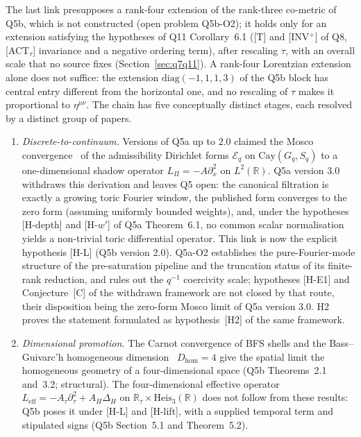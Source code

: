 \documentclass[11pt,a4paper]{article}
\theoremstyle{definition}
\newcommand{\Heis}{\mathrm{Heis}}
\newcommand{\Leff}{L_{\mathrm{eff}}}
\newcommand{\Lpi}{L_\Pi}
\newcommand{\Atau}{A_\tau}
\newcommand{\AH}{A_H}
\newcommand{\Dhom}{D_{\mathrm{hom}}}
\begin{document}
    The last link presupposes a rank-four extension of the rank-three co-metric of Q5b, which is
    not constructed (open problem Q5b-O2); it holds only for an extension satisfying the
    hypotheses of Q11 Corollary~6.1 ([T] and [INV$^+$] of Q8, [ACT$_\tau$] invariance and a negative ordering term), after rescaling
    $\tau$, with an overall scale that no source fixes (Section~\ref{sec:q7q11}).
    A rank-four Lorentzian extension alone does not suffice: the extension
    $\mathrm{diag}(-1, 1, 1, 3)$ of the Q5b block has central entry different from the horizontal
    one, and no rescaling of $\tau$ makes it proportional to $\eta^{\mu\nu}$.
    The chain has five conceptually distinct stages, each resolved by a distinct group of papers.

    \begin{enumerate}
      \item \textit{Discrete-to-continuum.}
      Versions of Q5a up to 2.0 claimed the Mosco convergence~\cite{Mosco1994} of the admissibility
      Dirichlet forms $\mathcal{E}_q$ on $\mathrm{Cay}(G_q, S_q)$ to a one-dimensional shadow
      operator $\Lpi = -A\partial_x^2$ on $L^2(\mathbb{R})$.
      Q5a version 3.0 withdraws this derivation and leaves Q5 open: the canonical filtration
      is exactly a growing toric Fourier window, the published form converges to the zero
      form (assuming uniformly bounded weights), and, under the hypotheses [H-depth] and [H-$w'$] of Q5a Theorem~6.1, no common
      scalar normalisation yields a non-trivial toric differential operator.
      This link is now the explicit hypothesis [H-L] (Q5b version 2.0).
      Q5a-O2 establishes the pure-Fourier-mode structure of the pre-saturation pipeline and the
      truncation status of its finite-rank reduction, and rules out the $q^{-1}$ coercivity
      scale; hypotheses [H-E1] and Conjecture~[C] of the withdrawn framework are not closed by
      that route, their disposition being the zero-form Mosco limit of Q5a version 3.0.
      H2 proves the statement formulated as hypothesis~[H2] of the same framework.

      \item \textit{Dimensional promotion.}
      The Carnot convergence of BFS shells and the Bass--Guivarc'h homogeneous
      dimension~\cite{Bass1972,Guivarch1973}
      $\Dhom = 4$ give the spatial limit the homogeneous geometry of a four-dimensional space
      (Q5b Theorems~2.1 and~3.2; structural).
      The four-dimensional effective operator
      $\Leff = -\Atau\partial_\tau^2 + \AH\Delta_H$ on $\mathbb{R}_\tau \times \Heis_3(\mathbb{R})$
      does not follow from these results: Q5b poses it under [H-L] and [H-lift], with a supplied
      temporal term and stipulated signs (Q5b Section~5.1 and Theorem~5.2).


\end{enumerate}
\end{document}
